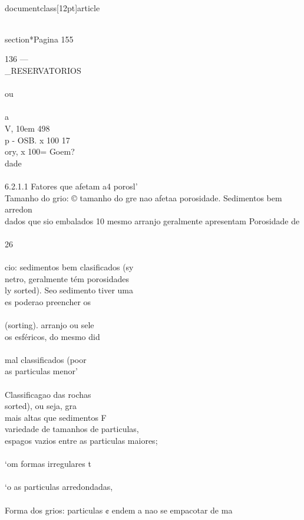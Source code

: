 \\documentclass[12pt]{article}
\begin{document}
\\section*{Pagina 155}

136 —\\_RESERVATORIOS\\
\\
ou\\
\\
a\\
V, 10em 498\\
p - OSB. x 100 17\\%
ory, x 100= Goem?\\
dade\\
\\
6.2.1.1 Fatores que afetam a4 porosl'\\
Tamanho do grio: © tamanho do gre nao afetaa porosidade. Sedimentos bem arredon\\
dados que sio embalados 10 mesmo arranjo geralmente apresentam Porosidade de\\
\\
26\\%
\\
cio: sedimentos bem clasificados (sy\\
netro, geralmente tém porosidades\\
ly sorted). Seo sedimento tiver uma\\
es poderao preencher os\\
\\
(sorting). arranjo ou sele\\
os esféricos, do mesmo did\\
\\
mal classificados (poor\\
as particulas menor’\\
\\
Classificagao das rochas\\
sorted), ou seja, gra\\
mais altas que sedimentos F\\
variedade de tamanhos de particulas,\\
espagos vazios entre as particulas maiores;\\
\\
‘om formas irregulares t\\
\\
‘o as particulas arredondadas,\\
\\
Forma dos grios: particulas ¢ endem a nao se empacotar de ma\\
\end{document}
